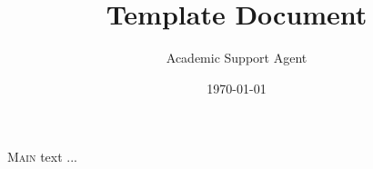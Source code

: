\documentclass{article}
\title{Template Document}
\author{Academic Support Agent}
\date{\today}
\begin{document}
\maketitle

\IJSRAopening
\lettrine{M}{ain} text ... 


\IJSRAseparator


\IJSRAclosing
\end{document}
